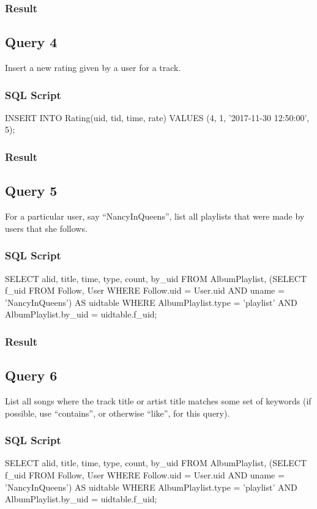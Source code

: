 \documentclass[letter, 12pt]{report}
\begin{document}
	\subsubsection{Result}
	
	\subsection{Query 4}
	Insert a new rating given by a user for a track.
	\subsubsection{SQL Script}
	\begin{spverbatim}
		INSERT INTO Rating(uid, tid, time, rate) VALUES (4, 1, '2017-11-30 12:50:00', 5);
	\end{spverbatim}
	\subsubsection{Result}
	
	\subsection{Query 5}
	For a particular user, say “NancyInQueens”, list all playlists that were made by users that she follows.
	\subsubsection{SQL Script}
	\begin{spverbatim}
		SELECT alid, title, time, type, count, by_uid FROM AlbumPlaylist,
		(SELECT f_uid FROM Follow, User
		WHERE Follow.uid = User.uid
		AND uname = 'NancyInQueens') AS uidtable
		WHERE AlbumPlaylist.type = 'playlist'
		AND AlbumPlaylist.by_uid = uidtable.f_uid;
	\end{spverbatim}
	\subsubsection{Result}
	
	\subsection{Query 6}
	List all songs where the track title or artist title matches some set of keywords (if possible, use
	``contains'', or otherwise ``like'', for this query).
	
	\subsubsection{SQL Script}
	\begin{spverbatim}
		SELECT alid, title, time, type, count, by_uid FROM AlbumPlaylist,
		(SELECT f_uid FROM Follow, User
		WHERE Follow.uid = User.uid
		AND uname = 'NancyInQueens') AS uidtable
		WHERE AlbumPlaylist.type = 'playlist'
		AND AlbumPlaylist.by_uid = uidtable.f_uid;
	\end{spverbatim}
\end{document}
